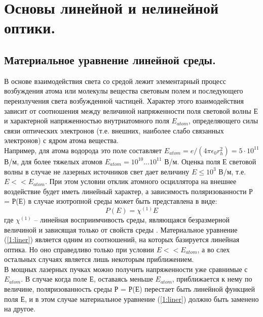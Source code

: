 \section{Основы линейной и нелинейной оптики.}

\subsection{Материальное уравнение линейной среды.}
\hspace*{2mm}
В основе взаимодействия света со средой лежит элементарный процесс возбуждения атома или молекулы вещества световым полем и последующего переизлучения света возбужденной частицей. Характер этого взаимодействия зависит от соотношения между величиной напряженности поля световой волны Е и характерной напряженностью внутриатомного поля  $E_{atom}$, определяющего силы связи оптических электронов (т.е. внешних, наиболее слабо связанных электронов) с ядром атома вещества.
\\
\hspace*{2mm}
Например, для атома водорода это поле составляет $ E_{atom} = e/(4\pi\epsilon_{0}r_{h}^2) = 5\cdot10^{11} $В/м, для более тяжелых атомов $ E_{atom} = 10^{10} \dots 10^{11} $ В/м. Оценка поля Е световой волны в случае не лазерных источников свет дает величину $E \le 10^3$ В/м, т.е. $E<<E_{atom} $. При этом условии отклик атомного осциллятора на внешнее воздействие будет иметь линейный характер, а зависимость поляризованности Р = Р(Е) в случае изотропной среды может быть представлена в виде:
\begin{equation}\label{1:liner}
P(E) = \chi^{(1)}E
\end{equation}где $ \chi^{(1)}$ – линейная восприимчивость среды, являющаяся безразмерной величиной и зависящая только от свойств среды \cite{achmanov2}.
Материальное уравнение (\ref{1:liner}) является одним из соотношений, на которых базируется линейная оптика.  Но оно справедливо только при условии $E << E_{atom} $, а во слех остальных случаях является лишь некоторым приближением. 
\\
В мощных лазерных пучках можно получить напряженности уже сравнимые с $E_{atom} $. В случае когда поле Е, оставаясь меньше $E_{atom} $, приближается к нему по величине, поляризованность среды Р = Р(Е) перестает быть линейной функцией поля Е, и в этом случае материальное уравнение (\ref{1:liner}) должно быть заменено на другое.

